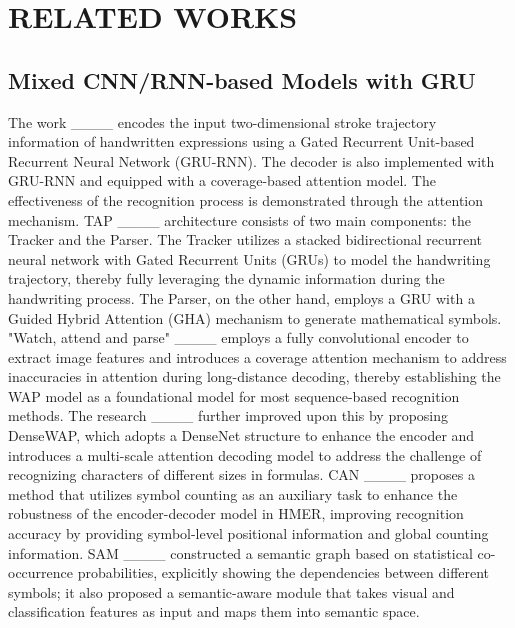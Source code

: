 \section{RELATED WORKS}
\subsection{Mixed CNN/RNN-based Models with GRU}
The work ____ encodes the input two-dimensional stroke trajectory information of handwritten expressions using a Gated Recurrent Unit-based Recurrent Neural Network (GRU-RNN). The decoder is also implemented with GRU-RNN and equipped with a coverage-based attention model. The effectiveness of the recognition process is demonstrated through the attention mechanism. TAP ____ architecture consists of two main components: the Tracker and the Parser. The Tracker utilizes a stacked bidirectional recurrent neural network with Gated Recurrent Units (GRUs) to model the handwriting trajectory, thereby fully leveraging the dynamic information during the handwriting process. The Parser, on the other hand, employs a GRU with a Guided Hybrid Attention (GHA) mechanism to generate mathematical symbols.  "Watch, attend and parse" ____ employs a fully convolutional encoder to extract image features and introduces a coverage attention mechanism to address inaccuracies in attention during long-distance decoding, thereby establishing the WAP model as a foundational model for most sequence-based recognition methods. The research ____ further improved upon this by proposing DenseWAP, which adopts a DenseNet structure to enhance the encoder and introduces a multi-scale attention decoding model to address the challenge of recognizing characters of different sizes in formulas. CAN ____ proposes a method that utilizes symbol counting as an auxiliary task to enhance the robustness of the encoder-decoder model in HMER, improving recognition accuracy by providing symbol-level positional information and global counting information. SAM ____ constructed a semantic graph based on statistical co-occurrence probabilities, explicitly showing the dependencies between different symbols; it also proposed a semantic-aware module that takes visual and classification features as input and maps them into semantic space. 

